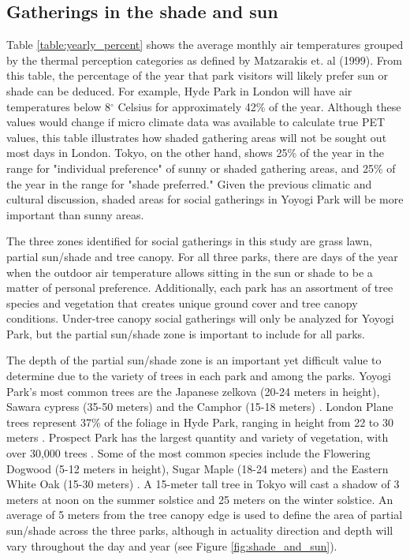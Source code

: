 \begin{multicols}{2}

\subsection{Gatherings in the shade and sun}
Table \ref{table:yearly_percent} shows the average monthly air temperatures grouped by the thermal perception categories as defined by Matzarakis et. al (1999). From this table, the percentage of the year that park visitors will likely prefer sun or shade can be deduced. For example, Hyde Park in London will have air temperatures below 8$^{\circ}$ Celsius for approximately 42\% of the year. Although these values would change if micro climate data was available to calculate true PET values, this table illustrates how shaded gathering areas will not be sought out most days in London. Tokyo, on the other hand, shows 25\% of the year in the range for "individual preference" of sunny or shaded gathering areas, and 25\% of the year in the range for "shade preferred." Given the previous climatic and cultural discussion, shaded areas for social gatherings in Yoyogi Park will be more important than sunny areas. 

The three zones identified for social gatherings in this study are grass lawn, partial sun/shade and tree canopy. For all three parks, there are days of the year when the outdoor air temperature allows sitting in the sun or shade to be a matter of personal preference. Additionally, each park has an assortment of tree species and vegetation that creates unique ground cover and tree canopy conditions. Under-tree canopy social gatherings will only be analyzed for Yoyogi Park, but the partial sun/shade zone is important to include for all parks. 

The depth of the partial sun/shade zone is an important yet difficult value to determine due to the variety of trees in each park and among the parks. Yoyogi Park's most common trees are the Japanese zelkova (20-24 meters in height), Sawara cypress (35-50 meters) and the Camphor (15-18 meters) \cite{noauthor__nodate}. London Plane trees represent 37\% of the foliage in Hyde Park, ranging in height from 22 to 30 meters \cite{noauthor_i-tree_nodate}. Prospect Park has the largest quantity and variety of vegetation, with over 30,000 trees \cite{tours_trees_2020}. Some of the most common species include the Flowering Dogwood (5-12 meters in height), Sugar Maple (18-24 meters) and the Eastern White Oak (15-30 meters) \cite{says_tree_nodate}. A 15-meter tall tree in Tokyo will cast a shadow of 3 meters at noon on the summer solstice and 25 meters on the winter solstice. An average of 5 meters from the tree canopy edge is used to define the area of partial sun/shade across the three parks, although in actuality direction and depth will vary throughout the day and year (see Figure \ref{fig:shade_and_sun}). 


\end{multicols}
